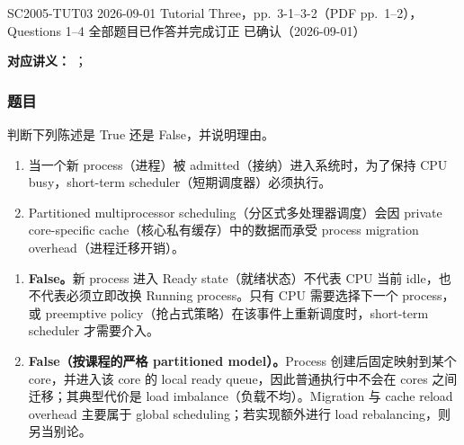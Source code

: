 
\label{tutorial:SC2005-TUT03}

\tutorialmeta
  {SC2005-TUT03}
  {2026-09-01}
  {Tutorial Three，pp.~3-1--3-2（PDF pp.~1--2），Questions 1--4}
  {全部题目已作答并完成订正}
  {已确认（2026-09-01）}


\textbf{对应讲义：}
；

\subsubsection*{题目}

判断下列陈述是 True 还是 False，并说明理由。

\begin{enumerate}[label=(\alph*)]
  \item 当一个新 process（进程）被 admitted（接纳）进入系统时，为了保持 CPU busy，short-term scheduler（短期调度器）必须执行。
  \item Partitioned multiprocessor scheduling（分区式多处理器调度）会因 private core-specific cache（核心私有缓存）中的数据而承受 process migration overhead（进程迁移开销）。
\end{enumerate}

\begin{checkedsolution}
\begin{enumerate}[label=(\alph*)]
  \item \textbf{False。}新 process 进入 Ready state（就绪状态）不代表 CPU 当前 idle，也不代表必须立即改换 Running process。只有 CPU 需要选择下一个 process，或 preemptive policy（抢占式策略）在该事件上重新调度时，short-term scheduler 才需要介入。
  \item \textbf{False（按课程的严格 partitioned model）。}Process 创建后固定映射到某个 core，并进入该 core 的 local ready queue，因此普通执行中不会在 cores 之间迁移；其典型代价是 load imbalance（负载不均）。Migration 与 cache reload overhead 主要属于 global scheduling；若实现额外进行 load rebalancing，则另当别论。
\end{enumerate}
\end{checkedsolution}

